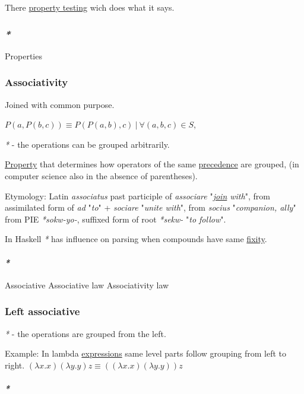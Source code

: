 \documentclass[a4paper,14pt,oneside]{book}
\begin{document}
There \hyperref[org6931a0f]{property testing} wich does what it says.

\subsubsection{\emph{*}}
\label{sec:org6682842}

\label{orgaebb0b7}Properties

\subsubsection{\label{org9dd9a70}Associativity}
\label{sec:org4ab86ba}
Joined with common purpose.

\(P(a,P(b,c)) \equiv P(P(a,b),c) \ | \ \forall (a,b,c) \in S\),

\emph{*} - the operations can be grouped arbitrarily.

\hyperref[org81d0df4]{Property} that determines how operators of the same \hyperref[org73e867c]{precedence} are grouped, (in computer science also in the absence of parentheses).

Etymology:
Latin \emph{associatus} past participle of \emph{associare} "\emph{\hyperref[org4213b71]{join} with}", from assimilated form of \emph{ad} "\emph{to}" + \emph{sociare} "\emph{unite with}", from \emph{socius} "\emph{companion, ally}" from PIE \emph{*sokw-yo-}, suffixed form of root \emph{*sekw-} "\emph{to follow}".

In Haskell \emph{*} has influence on parsing when compounds have same \hyperref[org7454d41]{fixity}.

\paragraph{\emph{*}}
\label{sec:org162bb7a}

\label{org9127e11}Associative
\label{org617ba87}Associative law
\label{org716e8d0}Associativity law

\subsubsection{\label{org014077e}Left associative}
\label{sec:org84c5f9f}
\emph{*} - the operations are grouped from the left.

Example:
In lambda \hyperref[org0ad8ca9]{expressions} same level parts follow grouping from left to right.
\((\lambda x . x)(\lambda y . y)z \equiv ((\lambda x . x)(\lambda y . y))z\)

\paragraph{\emph{*}}
\label{sec:org0279f98}
\end{document}
